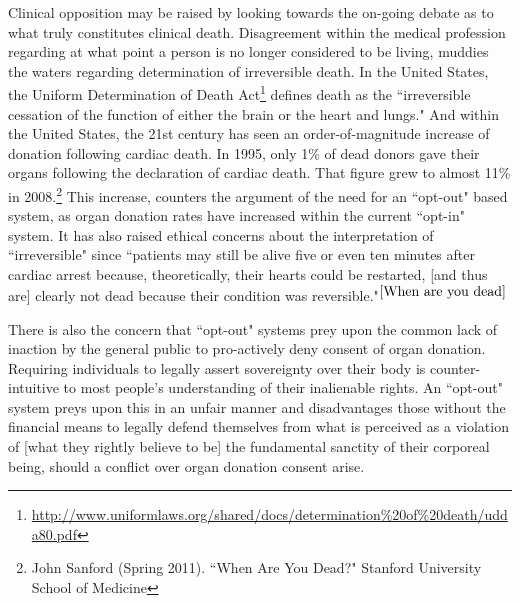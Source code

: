 \documentclass[letterpaper,10pt,twoside]{article}
\begin{document}
Clinical opposition may be raised by looking towards the on-going debate as to what truly constitutes clinical death.  Disagreement within the medical profession regarding at what point a person is no longer considered to be living, muddies the waters regarding determination of irreversible death.  In the United States, the Uniform Determination of Death Act\footnote{\url{http://www.uniformlaws.org/shared/docs/determination\%20of\%20death/udda80.pdf}} defines death as the ``irreversible cessation of the function of either the brain or the heart and lungs."  And within the United States, the 21st century has seen an order-of-magnitude increase of donation following cardiac death.  In 1995, only 1\% of dead donors gave their organs following the declaration of cardiac death.  That figure grew to almost 11\% in 2008.\footnote{\label{When are you dead}John Sanford (Spring 2011). ``When Are You Dead?" Stanford University School of Medicine}  This increase, counters the argument of the need for an ``opt-out" based system, as organ donation rates have increased within the current ``opt-in" system.  It has also raised ethical concerns about the interpretation of ``irreversible" since ``patients may still be alive five or even ten minutes after cardiac arrest because, theoretically, their hearts could be restarted, [and thus are] clearly not dead because their condition was reversible."$^{\ref{When are you dead}}$  

There is also the concern that ``opt-out" systems prey upon the common lack of inaction by the general public to pro-actively deny consent of organ donation.  Requiring individuals to legally assert sovereignty over their body is counter-intuitive to most people's understanding of their inalienable rights.  An ``opt-out" system preys upon this in an unfair manner and disadvantages those without the financial means to legally defend themselves from what is perceived as a violation of [what they rightly believe to be] the fundamental sanctity of their corporeal being, should a conflict over organ donation consent arise.
\end{document}
